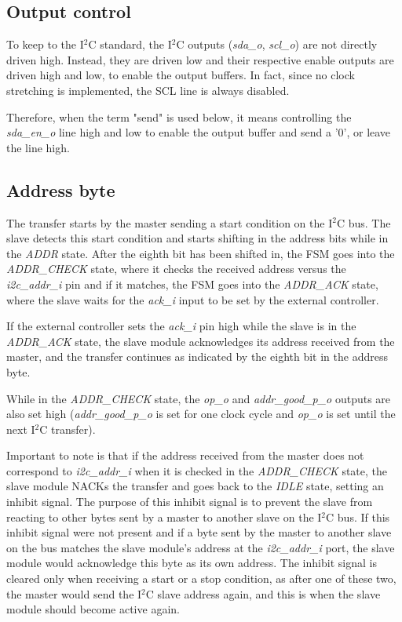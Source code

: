 \documentclass[a4paper,11pt]{article}
\begin{document}
\subsection{Output control}

To keep to the I$^2$C standard, the I$^2$C outputs (\textit{sda\_o}, \textit{scl\_o}) are
not directly driven high. Instead, they are driven low and their respective enable outputs
are driven high and low, to enable the output buffers. In fact, since no clock stretching
is implemented, the SCL line is always disabled.

Therefore, when the term "send" is used below, it means controlling the \textit{sda\_en\_o}
line high and low to enable the output buffer and send a '0', or leave the line high.

\subsection{Address byte}

The transfer starts by the master sending a start condition on the I$^2$C bus.
The slave detects this start condition and starts shifting in the address bits while in the
\textit{ADDR} state. After the eighth bit has been shifted in, the FSM goes into the
\textit{ADDR\_CHECK} state, where it checks the received address versus the
\textit{i2c\_addr\_i} pin and if it matches, the FSM goes into the \textit{ADDR\_ACK} state,
where the slave waits for the \textit{ack\_i} input to be set by the external controller.

If the external controller sets the \textit{ack\_i} pin high while the slave is
in the \textit{ADDR\_ACK} state, the slave module acknowledges its address received
from the master, and the transfer continues as indicated by the eighth bit in the
address byte.

While in the \textit{ADDR\_CHECK} state, the \textit{op\_o} and \textit{addr\_good\_p\_o}
outputs are also set high (\textit{addr\_good\_p\_o} is set for one clock cycle and
\textit{op\_o} is set until the next I$^2$C transfer).

Important to note is that if the address received from the master does not correspond
to \textit{i2c\_addr\_i} when it is checked in the \textit{ADDR\_CHECK} state, the
slave module NACKs the transfer and goes back to the \textit{IDLE} state, setting an inhibit
signal. The purpose of this inhibit signal is to prevent the slave from reacting to
other bytes sent by a master to another slave on the I$^2$C bus. If this inhibit
signal were not present and if a byte sent by the master to another slave on the bus
matches the slave module's address at the \textit{i2c\_addr\_i} port, the slave module
would acknowledge this byte as its own address. The inhibit signal is cleared only when
receiving a start or a stop condition, as after one of these two, the master would
send the I$^2$C slave address again, and this is when the slave module should become
active again.
\end{document}
